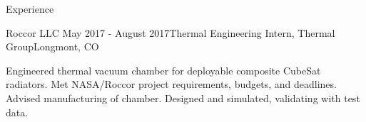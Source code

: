 \documentclass{resume} %
\begin{document}
\begin{rSection}{Experience}


\begin{rSubsection}{Roccor LLC }{May 2017 - August 2017}{Thermal Engineering Intern, Thermal Group}{Longmont, CO}
\item {\small Engineered thermal vacuum chamber for deployable composite CubeSat radiators. Met NASA/Roccor project requirements, budgets, and deadlines. Advised manufacturing of chamber. Designed and simulated, validating with test data.}
\end{rSubsection}


\end{rSection}
\end{document}
